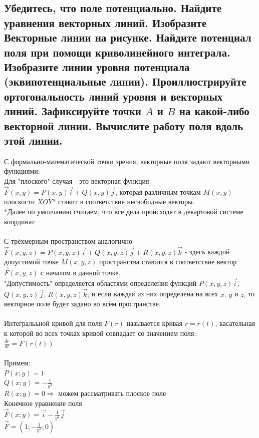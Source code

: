 \documentclass{article}
\begin{document}
        \subsection{Убедитесь, что поле потенциально. Найдите уравнения векторных линий. Изобразите Векторные линии на рисунке. Найдите потенциал поля при помощи криволинейного интеграла. Изобразите линии уровня потенциала (эквипотенциальные линии). Проиллюстрируйте ортогональность линий уровня и векторных линий. Зафиксируйте точки $A$ и $B$ на какой-либо векторной линии. Вычислите работу поля вдоль этой линии.}
            С формально-математической точки зрения, векторные поля задают векторными функциями:\\
            Для "плоского" случая - это векторная функция $\vec{F}(x, y) = P(x, y)\vec{i} + Q(x, y)\vec{j}$, которая различным точкам $M(x, y)$ плоскости $XOY$* ставит в соответствие несвободные векторы.\\
            *Далее по умолчанию считаем, что все дела происходят в декартовой системе координат\\\\
            С трёхмерным пространством аналогично\\
            $\vec{F}(x, y, z) = P(x, y, z)\vec{i} + Q(x, y, z)\vec{j} + R(x, y, z)\vec{k}$ - здесь каждой допустимой точке $M(x, y, z)$ пространства ставится в соответствие вектор $\vec{F}(x, y, z)$ с началом в данной точке.\\
            "Допустимость" определяется областями определения функций $P(x, y, z)\vec{i}$, $Q(x, y, z)\vec{j}$, $R(x, y, z)\vec{k}$, и если каждая из них определена на всех $x$, $y$ и $z$, то векторное поле будет задано во всём пространстве.\\\\
            Интегралььной кривой для поля $F(r)$ называется кривая $r = r(t)$, касательная к которой во всех точках кривой совпадает со значением поля:\\
            $\frac{dr}{dt} = F(r(t))$\\\\
            Примем:\\
            $P(x; y) = 1$\\
            $Q(x; y) = -\frac{1}{y^2}$\\
            $R(x; y) = 0 \Rightarrow $ можем рассматривать плоское поле\\
            Конечное уравнение поля\\
            $\vec{F}(x;y) = \vec{i}-\frac{1}{y^2}\vec{j}$\\
            $\vec{F} = (1;-\frac{1}{y^2};0)$\\
\end{document}
